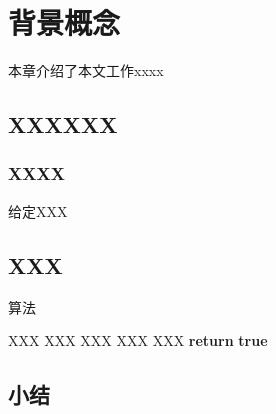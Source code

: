\newpage
{\centering\section{背景概念}}


本章介绍了本文工作xxxx



\subsection{XXXXXX}

\subsubsection{XXXX} 


\begin{myDef}[XXX]
\label{def_}
给定XXX
\end{myDef}




\subsection{XXX}






\begin{algorithm}[ht]
\caption{算法}
\label{algorithm} 
\begin{algorithmic}[1]
\REQUIRE XXX
\ENSURE  XXX
\STATE XXX
    \STATE XXX
\ENDIF
{}
         \STATE XXX
    \ENDFOR
\ENDFOR
\STATE \textbf{return} \textbf{true}
\end{algorithmic}  
\end{algorithm}  








\subsection{小结}


